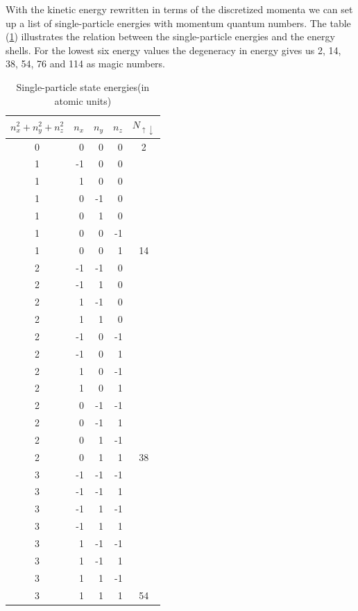 \documentclass[twoside,english]{uiofysmaster}
\begin{document}
With the kinetic energy rewritten in terms of the discretized momenta
we can set up a list of single-particle energies with momentum quantum
numbers.  The table (\ref{tab:spnumbers}) illustrates the relation
between the single-particle energies and the energy shells. For the
lowest six energy values the degeneracy in energy gives us 2, 14, 38,
54, 76 and 114 as magic numbers.

\begin{table}[!ht]
	\begin{center}
		\begin{tabular}{ c | r | r | r | c} 
			$n_x^2+n_y^2+n_z^2$& $n_x$ & $n_y$ & $n_z$ & $N_{\uparrow \downarrow}$ \\
			\hline
			\hline
			0& 0  & 0  & 0  & 2 \\ 
			1& -1 & 0  & 0  &  \\ 
			1& 1  & 0  & 0  &  \\ 
			1& 0  & -1 & 0  &  \\ 
			1& 0  & 1  & 0  &  \\ 
			1& 0  & 0  & -1 &  \\ 
			1& 0  & 0  & 1  & 14 \\ 
			2& -1 & -1 & 0  &  \\ 
			2& -1 & 1  & 0  &  \\ 
			2& 1  & -1 & 0  &  \\ 
			2& 1  & 1  & 0  &  \\ 
			2& -1 & 0  & -1 &  \\ 
			2& -1 & 0  & 1  &  \\ 
			2& 1  & 0  & -1 &  \\ 
			2& 1  & 0  & 1  &  \\ 
			2& 0  & -1 & -1 &  \\ 
			2& 0  & -1 & 1  &  \\ 
			2& 0  & 1  & -1 &  \\ 
			2& 0  & 1  & 1  & 38 \\ 
			3& -1 & -1 & -1 &  \\ 
			3& -1 & -1 & 1  &  \\ 
			3& -1 & 1  & -1 &  \\ 
			3&  -1& 1  & 1  &  \\ 
			3& 1  & -1 & -1 &  \\ 
			3& 1  & -1 & 1  &  \\ 
			3& 1  & 1  & -1 &  \\ 
			3& 1  & 1  & 1  & 54 \\ 
		\end{tabular} 
		\caption{Single-particle state energies(in atomic units)}
		\label{tab:spnumbers}
	\end{center}
\end{table}
\end{document}
